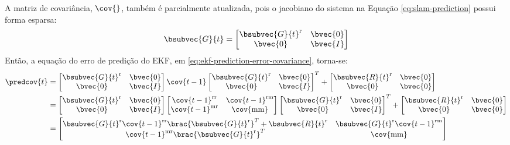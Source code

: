A matriz de covariância, $\cov{}$, também é parcialmente atualizada, pois o jacobiano do sistema na Equação \ref{eq:slam-prediction} possui forma esparsa:
\newcommand{\slamsystemjacobian}{
  \bsubvec{G}{t} = \begin{bmatrix}
    \bsubvec{G}{t}^{\mathrm{r}} & \bvec{0} \\
    \bvec{0} & \bvec{I}
  \end{bmatrix}
}
\begin{equation}
  \slamsystemjacobian
  \label{eq:slam-system-jacobian}
\end{equation}
Então, a equação do erro de predição do EKF, em \ref{eq:ekf-prediction-error-covariance}, torna-se:
\renewcommand{\arraystretch}{1.5}
\begin{equation}
\begin{aligned}
  \predcov{t} &= \begin{bmatrix}
    \bsubvec{G}{t}^\mathrm{r} & \bvec{0} \\
    \bvec{0} & \bvec{I}
  \end{bmatrix} \cov{t-1}  \begin{bmatrix}
    \bsubvec{G}{t}^\mathrm{r} & \bvec{0} \\
    \bvec{0} & \bvec{I}  
  \end{bmatrix}^T + \begin{bmatrix}
      \bsubvec{R}{t}^{\mathrm{r}}  & \bvec{0} \\ \bvec{0} & \bvec{0}
    \end{bmatrix} \\
  &= \begin{bmatrix}
    \bsubvec{G}{t}^\mathrm{r} & \bvec{0} \\
    \bvec{0} & \bvec{I}
  \end{bmatrix} 
  \begin{bmatrix}
    \cov{t-1}^{\mathrm{rr}} & \cov{t-1}^{\mathrm{rm}} \\
    \cov{t-1}^{\mathrm{mr}} & \cov{\mathrm{mm}}
  \end{bmatrix}  
  \begin{bmatrix}
    \bsubvec{G}{t}^\mathrm{r} & \bvec{0} \\
    \bvec{0} & \bvec{I}  
  \end{bmatrix}^T + \begin{bmatrix}
      \bsubvec{R}{t}^{\mathrm{r}} & \bvec{0} \\ \bvec{0} & \bvec{0}
    \end{bmatrix} \\
  &= \begin{bmatrix}
    \bsubvec{G}{t}^\mathrm{r} \cov{t-1}^\mathrm{rr} \brac{\bsubvec{G}{t}^\mathrm{r}}^T + \bsubvec{R}{t}^{\mathrm{r}}&  \bsubvec{G}{t}^\mathrm{r} \cov{t-1}^\mathrm{rm}\\
    \cov{t-1}^\mathrm{mr}\brac{\bsubvec{G}{t}^\mathrm{r}}^T & \cov{\mathrm{mm}} 
  \end{bmatrix} 
\end{aligned}
\label{eq:ekf-slam-prediction-error-covariance}
\end{equation}
